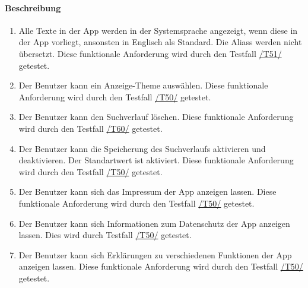 \paragraph{Beschreibung}
\begin{enumerate}[start=51, label=\textbf{/FA\arabic*/}, align=left]
    \item \label{/FA51/} Alle Texte in der App werden in der Systemsprache angezeigt, wenn diese in der App vorliegt, ansonsten in Englisch als Standard. Die \Glspl{Alias} werden nicht übersetzt. Diese funktionale Anforderung wird durch den Testfall \hyperref[/T51/]{/T51/} getestet.
    \item \label{/FA52/} Der \Gls{Benutzer} kann ein Anzeige-\Gls{Theme} auswählen. Diese funktionale Anforderung wird durch den Testfall \hyperref[/T50/]{/T50/} getestet.
    \item \label{/FA53/} Der \Gls{Benutzer} kann den \Gls{Suchverlauf} löschen. Diese funktionale Anforderung wird durch den Testfall \hyperref[/T60/]{/T60/} getestet.
    \item \label{/FA54/} Der \Gls{Benutzer} kann die Speicherung des \Gls{Suchverlauf}s aktivieren und deaktivieren. Der Standartwert ist \dq aktiviert\dq{}. Diese funktionale Anforderung wird durch den Testfall \hyperref[/T50/]{/T50/} getestet.
    \item \label{/FA55/} Der \Gls{Benutzer} kann sich das Impressum der App anzeigen lassen. Diese funktionale Anforderung wird durch den Testfall \hyperref[/T50/]{/T50/} getestet.
    \item \label{/FA56/} Der \Gls{Benutzer} kann sich Informationen zum Datenschutz der App anzeigen lassen. Dies wird durch Testfall \hyperref[/T50/]{/T50/} getestet.
    \item \label{/FA57/} Der \Gls{Benutzer} kann sich Erklärungen zu verschiedenen Funktionen der App anzeigen lassen. Diese funktionale Anforderung wird durch den Testfall \hyperref[/T50/]{/T50/} getestet.
\end{enumerate}